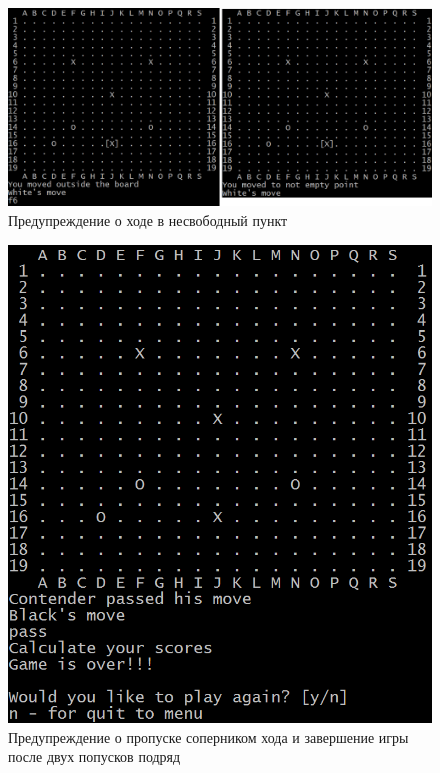 \begin{figure}[H]
	\begin{center}
		\includegraphics[scale=0.6]{pics/GoCUI/NotEmpty.png}
	    \caption{Предупреждение о ходе в несвободный пункт} 
		\label{pic:CUI_NotEmpty}
	\end{center}
\end{figure}

\begin{figure}[H]
	\begin{center}
		\includegraphics[scale=0.6]{pics/GoCUI/Pass.png}
	    \caption{Предупреждение о пропуске соперником хода и завершение игры после двух попусков подряд} 
		\label{pic:CUI_Pass}
	\end{center}
\end{figure}

